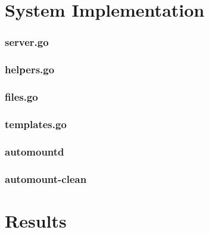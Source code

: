 \documentclass[12pt]{article}
\begin{document}
\fi  %


\iftrue  %


\section{System Implementation}

\lstset{language=Go}
\lstset{basicstyle=\ttffamily}

\subsubsection{server.go}
%

\subsubsection{helpers.go}


\subsubsection{files.go}


\subsubsection{templates.go}


\lstset{language=Bash}

\subsubsection{automountd}


\subsubsection{automount-clean}



\fi  %


\fontsize{12pt}{24pt}\selectfont

\iftrue  %

\section{Results}
\end{document}
